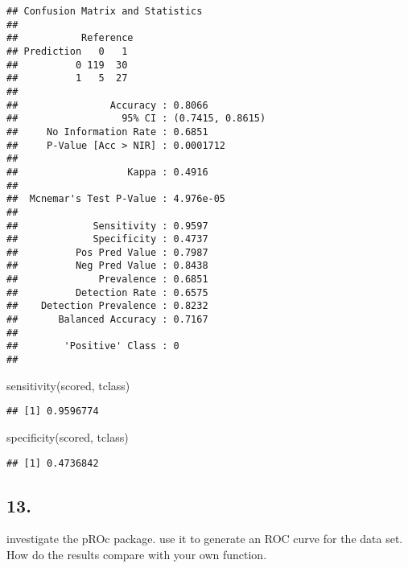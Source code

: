 \documentclass[
]{article}
\newenvironment{Shaded}{\begin{snugshade}}{\end{snugshade}}
\newcommand{\FunctionTok}[1]{\textcolor[rgb]{0.00,0.00,0.00}{#1}}
\newcommand{\NormalTok}[1]{#1}
\begin{document}
\begin{verbatim}
## Confusion Matrix and Statistics
## 
##           Reference
## Prediction   0   1
##          0 119  30
##          1   5  27
##                                           
##                Accuracy : 0.8066          
##                  95% CI : (0.7415, 0.8615)
##     No Information Rate : 0.6851          
##     P-Value [Acc > NIR] : 0.0001712       
##                                           
##                   Kappa : 0.4916          
##                                           
##  Mcnemar's Test P-Value : 4.976e-05       
##                                           
##             Sensitivity : 0.9597          
##             Specificity : 0.4737          
##          Pos Pred Value : 0.7987          
##          Neg Pred Value : 0.8438          
##              Prevalence : 0.6851          
##          Detection Rate : 0.6575          
##    Detection Prevalence : 0.8232          
##       Balanced Accuracy : 0.7167          
##                                           
##        'Positive' Class : 0               
## 
\end{verbatim}

\begin{Shaded}
\begin{Highlighting}[]
\FunctionTok{sensitivity}\NormalTok{(scored, tclass)}
\end{Highlighting}
\end{Shaded}

\begin{verbatim}
## [1] 0.9596774
\end{verbatim}

\begin{Shaded}
\begin{Highlighting}[]
\FunctionTok{specificity}\NormalTok{(scored, tclass)}
\end{Highlighting}
\end{Shaded}

\begin{verbatim}
## [1] 0.4736842
\end{verbatim}

\hypertarget{section-2}{%
\subsection{13.}\label{section-2}}

investigate the pROc package. use it to generate an ROC curve for the
data set. How do the results compare with your own function.
\end{document}
